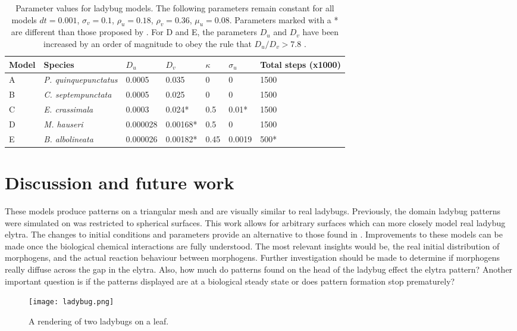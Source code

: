 \begin{table}[p]
	\centering
	\begin{tabular}{|l|l|l|l|l|l|l|}
	\hline
	Model & Species                    &$D_u$   &$D_v$    &$\kappa$ &$\sigma_u$ &Total steps (x1000)\\ \hline 
	A     &\textit{P. quinquepunctatus}&0.0005  &0.035    &0        &0          & 1500              \\ \hline
	B     &\textit{C. septempunctata}  &0.0005  &0.025    &0        &0          & 1500              \\ \hline
	C     &\textit{E. crassimala}      &0.0003  &0.024*   &0.5      &0.01*      & 1500              \\ \hline
	D     &\textit{M. hauseri}         &0.000028&0.00168* &0.5      &0          & 1500              \\ \hline
	E     &\textit{B. albolineata}     &0.000026&0.00182* &0.45     &0.0019     & 500*              \\
	\hline
	\end{tabular}
	\caption {Parameter values for ladybug models. The following parameters remain constant for all models $dt = 0.001$, $\sigma_v= 0.1$, $\rho_u = 0.18$, $\rho_v = 0.36$, $\mu_u = 0.08$. Parameters marked with a * are different than those proposed by \citet{Liaw2001}. For D and E, the parameters $D_u$ and $D_v$ have been increased by an order of magnitude to obey the rule that $D_u / D_v > 7.8$ \citep{Liaw2001}.}
	\label{tab:ladyBugParameters}
\end{table}

\section{Discussion and future work}
These models produce patterns on a triangular mesh and are visually similar to real ladybugs. Previously, the domain ladybug patterns were simulated on was restricted to spherical surfaces. This work allows for arbitrary surfaces which can more closely model real ladybug elytra. The changes to initial conditions and parameters provide an alternative to those found in \citep{Liaw2001}. Improvements to these models can be made once the biological chemical interactions are fully understood. The most relevant insights would be, the real initial distribution of morphogens, and the actual reaction behaviour between morphogens. Further investigation should be made to determine if morphogens really diffuse across the gap in the elytra. Also, how much do patterns found on the head of the ladybug effect the elytra pattern? Another important question is if the patterns displayed are at a biological steady state or does pattern formation stop prematurely?

\begin{figure}[p]
	\centering
	\texttt{[image: ladybug.png]}
	\caption{A rendering of two ladybugs on a leaf.}
	\label{fig:ladybugRender}
\end{figure}
